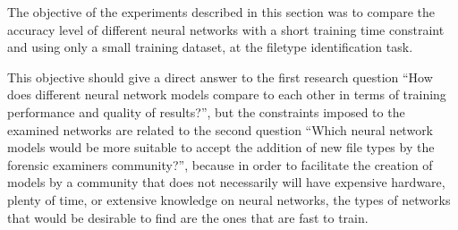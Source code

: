 The objective of the experiments described in this section 
was to compare the accuracy level of different neural networks with a short training time constraint and using only a small training dataset, at the filetype identification task.


This objective should give a direct answer to the first research question ``How does different neural network models compare to each other in terms of training performance and quality of results?'', but the constraints imposed to the examined networks are related to the second question ``Which neural network models would be more suitable to accept the addition of new file types by the forensic examiners community?'', because in order to facilitate the creation of models by a community that does not necessarily will have expensive hardware, plenty of time, or extensive knowledge on neural networks, the types of networks that would be desirable to find are the ones that are fast to train.
